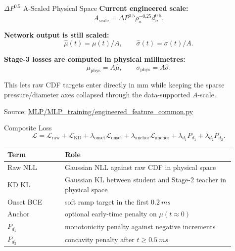 \documentclass[UTF8,aspectratio=169]{ctexbeamer}
\newcommand{\src}[1]{\vfill{\tiny\textcolor{gray!75!black}{Source: \url{#1}}}}
\begin{document}
\begin{frame}{\(\Delta P^{0.5}\) A-Scaled Physical Space}
\small
\textbf{Current engineered scale:}
\[
A_{\mathrm{scale}}=\Delta P^{0.5}\rho_a^{-0.25}d_n^{0.5}.
\]

\textbf{Network output is still scaled:}
\[
\hat \mu(t)=\mu(t)/A,\qquad \hat\sigma(t)=\sigma(t)/A.
\]

\textbf{Stage-3 losses are computed in physical millimetres:}
\[
\mu_{\mathrm{phys}}=A\hat\mu,\qquad
\sigma_{\mathrm{phys}}=A\hat\sigma.
\]

\vspace{0.25em}
This lets raw CDF targets enter directly in mm while keeping the sparse pressure/diameter axes collapsed through the data-supported \(A\)-scale.

\src{MLP/MLP_training/engineered_feature_common.py}
\end{frame}

\begin{frame}{Composite Loss}
\small
\[
\mathcal{L}
= \mathcal{L}_{\mathrm{raw}}
+ \mathcal{L}_{\mathrm{KD}}
+ \lambda_{\mathrm{onset}}\mathcal{L}_{\mathrm{onset}}
+ \lambda_{\mathrm{anchor}}\mathcal{L}_{\mathrm{anchor}}
+ \lambda_{d_1}P_{d_1}
+ \lambda_{d_2}P_{d_2}.
\]

\vspace{0.2em}
\begin{tabular}{L{0.23\linewidth}L{0.68\linewidth}}
\toprule
Term & Role \\
\midrule
Raw NLL & Gaussian NLL against raw CDF in physical space \\
KD KL & Gaussian KL between student and Stage-2 teacher in physical space \\
Onset BCE & soft ramp target in the first \(\SI{0.2}{ms}\) \\
Anchor & optional early-time penalty on \(\mu(t\approx0)\) \\
\(P_{d_1}\) & monotonicity penalty against negative increments \\
\(P_{d_2}\) & concavity penalty after \(t\geq\SI{0.5}{ms}\) \\
\bottomrule
\end{tabular}
\end{frame}
\end{document}
